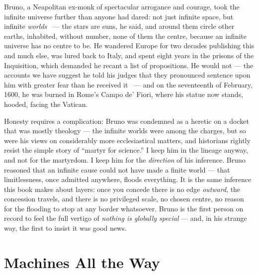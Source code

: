 \documentclass[fontsize=11pt,paper=a4,pagesize=auto,parskip=half-]{scrbook}
\begin{document}
Bruno, a Neapolitan ex-monk of spectacular arrogance and courage, took the infinite universe further than anyone had dared: not just infinite space, but infinite \emph{worlds}~\cite{bruno1584} --- the stars are suns, he said, and around them circle other earths, inhabited, without number, none of them the centre, because an infinite universe has no centre to be. He wandered Europe for two decades publishing this and much else, was lured back to Italy, and spent eight years in the prisons of the Inquisition, which demanded he recant a list of propositions. He would not --- the accounts we have suggest he told his judges that they pronounced sentence upon him with greater fear than he received it~\cite{rowland2008} --- and on the seventeenth of February, 1600, he was burned in Rome's Campo de' Fiori, where his statue now stands, hooded, facing the Vatican.

Honesty requires a complication: Bruno was condemned as a heretic on a docket that was mostly theology --- the infinite worlds were among the charges, but so were his views on considerably more ecclesiastical matters, and historians rightly resist the simple story of ``martyr for science.'' I keep him in the lineage anyway, and not for the martyrdom. I keep him for the \emph{direction} of his inference. Bruno reasoned that an infinite cause could not have made a finite world --- that limitlessness, once admitted anywhere, floods everything. It is the same inference this book makes about layers: once you concede there is no edge \emph{outward}, the concession travels, and there is no privileged scale, no chosen centre, no reason for the flooding to stop at any border whatsoever. Bruno is the first person on record to feel the full vertigo of \emph{nothing is globally special} --- and, in his strange way, the first to insist it was good news.

\section{Machines All the Way}
\end{document}
